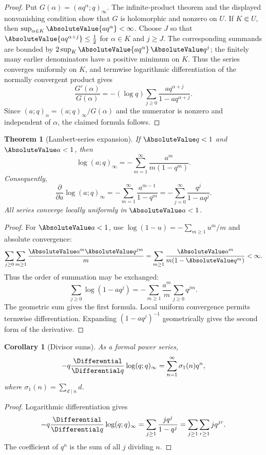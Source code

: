 \documentclass[11pt,a4paper,oneside,openany]{book}
\newtheorem{theorem}{Theorem}[chapter]
\newtheorem{corollary}[corollary]{Corollary}
\theoremstyle{definition}
\theoremstyle{remark}
\begin{document}
\begin{proof}
Put $G(\alpha)=(aq^\alpha;q)_\infty$.  The infinite-product theorem and the
displayed nonvanishing condition show that $G$ is holomorphic and nonzero on
$U$.  If $K\Subset U$, then
$\sup_{\alpha\in K}\AbsoluteValue{aq^\alpha}<\infty$.  Choose $J$ so that
$\AbsoluteValue{aq^{\alpha+j}}\le\tfrac12$ for $\alpha\in K$ and $j\ge J$.
The corresponding summands are bounded by
$2\sup_K\AbsoluteValue{aq^\alpha}\,\AbsoluteValue q^j$; the finitely many
earlier denominators have a positive minimum on $K$.  Thus the series
converges uniformly on $K$, and termwise logarithmic differentiation of the
normally convergent product gives
\[
 \frac{G'(\alpha)}{G(\alpha)}
 =-(\log q)\sum_{j\ge0}\frac{aq^{\alpha+j}}{1-aq^{\alpha+j}}.
\]
Since $(a;q)_\alpha=(a;q)_\infty/G(\alpha)$ and the numerator is nonzero and
independent of $\alpha$, the claimed formula follows.
\end{proof}

\begin{theorem}[Lambert-series expansion]\label{thm:lambert-log}
If $\AbsoluteValue q<1$ and $\AbsoluteValue a<1$, then
\[
 \log(a;q)_\infty
 =-\sum_{m=1}^{\infty}\frac{a^m}{m(1-q^m)}.
\]
Consequently,
\[
 \frac{\partial}{\partial a}\log(a;q)_\infty
 =-\sum_{m=1}^{\infty}\frac{a^{m-1}}{1-q^m}
 =-\sum_{j=0}^{\infty}\frac{q^j}{1-aq^j}.
\]
All series converge locally uniformly in $\AbsoluteValue a<1$.
\end{theorem}

\begin{proof}
For $\AbsoluteValue a<1$, use $\log(1-u)=-\sum_{m\ge1}u^m/m$ and absolute convergence:
\[
 \sum_{j\ge0}\sum_{m\ge1}\frac{\AbsoluteValue a^m\AbsoluteValue q^{jm}}{m}
 =\sum_{m\ge1}\frac{\AbsoluteValue a^m}{m(1-\AbsoluteValue q^m)}<\infty.
\]
Thus the order of summation may be exchanged:
\[
 \sum_{j\ge0}\log(1-aq^j)
 =-\sum_{m\ge1}\frac{a^m}{m}\sum_{j\ge0}q^{jm}.
\]
The geometric sum gives the first formula.  Local uniform convergence permits termwise differentiation.  Expanding $(1-aq^j)^{-1}$ geometrically gives the second form of the derivative.
\end{proof}

\begin{corollary}[Divisor sums]\label{cor:divisor-sum}
As a formal power series,
\[
 -q\frac{\Differential}{\Differential q}\log(q;q)_\infty
 =\sum_{n=1}^{\infty}\sigma_1(n)q^n,
\]
where $\sigma_1(n)=\sum_{d\mid n}d$.
\end{corollary}

\begin{proof}
Logarithmic differentiation gives
\[
 -q\frac{\Differential}{\Differential q}\log(q;q)_\infty
 =\sum_{j\ge1}\frac{j q^j}{1-q^j}
 =\sum_{j\ge1}\sum_{r\ge1}j q^{jr}.
\]
The coefficient of $q^n$ is the sum of all $j$ dividing $n$.
\end{proof}
\end{document}
